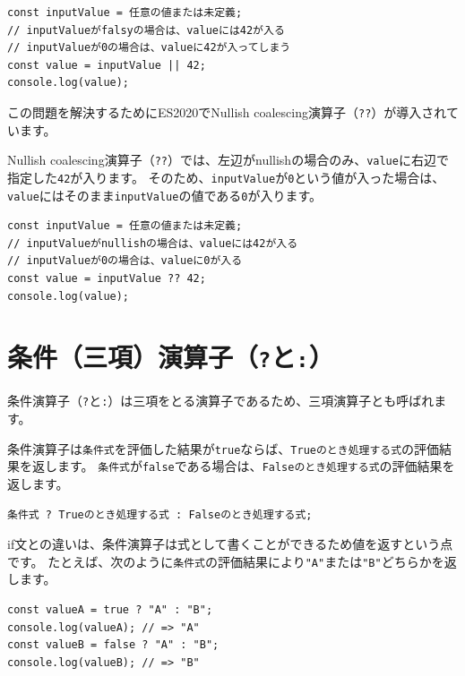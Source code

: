 \begin{lstlisting}
const inputValue = 任意の値または未定義;
// inputValueがfalsyの場合は、valueには42が入る
// inputValueが0の場合は、valueに42が入ってしまう
const value = inputValue || 42;
console.log(value);
\end{lstlisting}

この問題を解決するためにES2020でNullish coalescing演算子（\texttt{??}）が導入されています。

Nullish coalescing演算子（\texttt{??}）では、左辺がnullishの場合のみ、\texttt{value}に右辺で指定した\texttt{42}が入ります。
そのため、\texttt{inputValue}が\texttt{0}という値が入った場合は、\texttt{value}にはそのまま\texttt{inputValue}の値である\texttt{0}が入ります。

\begin{lstlisting}
const inputValue = 任意の値または未定義;
// inputValueがnullishの場合は、valueには42が入る
// inputValueが0の場合は、valueに0が入る
const value = inputValue ?? 42;
console.log(value);
\end{lstlisting}

\hypertarget{ternary-operator}{%
\section{\texorpdfstring{条件（三項）演算子（\texttt{?}と\texttt{:}）}{条件（三項）演算子（?と:）}}\label{ternary-operator}}

条件演算子（\texttt{?}と\texttt{:}）は三項をとる演算子であるため、三項演算子とも呼ばれます。

条件演算子は\texttt{条件式}を評価した結果が\texttt{true}ならば、\texttt{Trueのとき処理する式}の評価結果を返します。
\texttt{条件式}が\texttt{false}である場合は、\texttt{Falseのとき処理する式}の評価結果を返します。

\begin{lstlisting}
条件式 ? Trueのとき処理する式 : Falseのとき処理する式;
\end{lstlisting}

if文との違いは、条件演算子は式として書くことができるため値を返すという点です。
たとえば、次のように\texttt{条件式}の評価結果により\texttt{"A"}または\texttt{"B"}どちらかを返します。

\begin{lstlisting}
const valueA = true ? "A" : "B";
console.log(valueA); // => "A"
const valueB = false ? "A" : "B";
console.log(valueB); // => "B"
\end{lstlisting}

